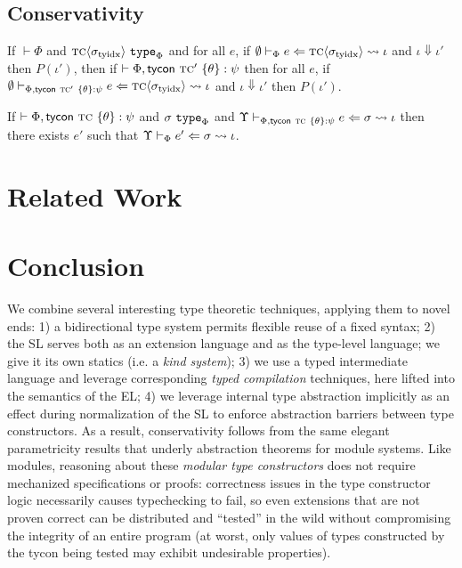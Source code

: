 \documentclass{llncs}
\begin{document}
\subsection{Conservativity}
\begin{theorem}[Conservativity]
If $\vdash \Phi$ and ${\textsc{tc}}\langle\sigma_\text{tyidx}\rangle~\texttt{type}_{\Phi}$ and for all $e$, if $\emptyset \vdash_{\Phi} e \Leftarrow {\textsc{tc}}\langle\sigma_\text{tyidx}\rangle \leadsto \iota$ and $\iota \Downarrow \iota'$ then $P(\iota')$, then if $\vdash \Phi, {\sf tycon}~\textsc{tc}' ~\{\theta\} : \psi$ then for all $e$, if $\emptyset \vdash_{\Phi, {\sf tycon}~\textsc{tc}' ~\{\theta\} : \psi} e \Leftarrow {\textsc{tc}}\langle\sigma_\text{tyidx}\rangle \leadsto \iota$ and $\iota \Downarrow \iota'$ then $P(\iota')$.
\end{theorem}

\begin{lemma}
If $\vdash \Phi, {\sf tycon}~\textsc{tc} ~\{\theta\} : \psi$ and $\sigma~\texttt{type}_{\Phi}$ and $\Upsilon \vdash_{\Phi, {\sf tycon}~\textsc{tc} ~\{\theta\} : \psi} e \Leftarrow \sigma \leadsto \iota$ then there exists $e'$ such that $\Upsilon \vdash_{\Phi} e' \Leftarrow \sigma \leadsto \iota$.
\end{lemma}

\section{Related Work}\label{prior-work}

\section{Conclusion}\label{conclusion}
We combine several interesting type theoretic techniques, applying them to novel ends: 1)  a bidirectional type system permits flexible reuse of a fixed syntax; 2) the SL serves both as an extension language and as the type-level language; we give it its own statics (i.e. a \emph{kind system}); 3) we use a typed intermediate language and leverage corresponding \emph{typed compilation} techniques, here lifted into the semantics of the EL; 4) we leverage internal type abstraction implicitly as an effect during normalization of the SL to enforce abstraction barriers between type constructors. 
As a result, conservativity follows from the same elegant parametricity results that underly  abstraction theorems for module systems. 
Like modules, reasoning about these \emph{modular type constructors} does not require  mechanized specifications or proofs: correctness issues in the type constructor logic necessarily causes typechecking to fail, so even extensions that are not proven correct can be distributed and ``tested'' in the wild without compromising the integrity of an entire program (at worst, only values of types constructed by the tycon being tested may exhibit undesirable properties). 
\end{document}
